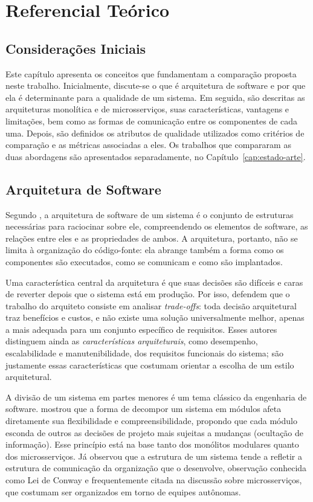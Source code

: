\chapter{Referencial Teórico}
\label{cap:referencial}

\section{Considerações Iniciais}

Este capítulo apresenta os conceitos que fundamentam a comparação proposta neste trabalho.
Inicialmente, discute-se o que é arquitetura de software e por que ela é determinante para a
qualidade de um sistema. Em seguida, são descritas as arquiteturas monolítica e de
microsserviços, suas características, vantagens e limitações, bem como as formas de
comunicação entre os componentes de cada uma. Depois, são definidos os atributos de qualidade
utilizados como critérios de comparação e as métricas associadas a eles. Os trabalhos que
compararam as duas abordagens são apresentados separadamente, no
Capítulo~\ref{cap:estado-arte}.

\section{Arquitetura de Software}

Segundo , a arquitetura de software de um sistema é o conjunto de
estruturas necessárias para raciocinar sobre ele, compreendendo os elementos de software, as
relações entre eles e as propriedades de ambos. A arquitetura, portanto, não se limita à
organização do código-fonte: ela abrange também a forma como os componentes são executados,
como se comunicam e como são implantados.

Uma característica central da arquitetura é que suas decisões são difíceis e caras de reverter
depois que o sistema está em produção. Por isso,  defendem que o
trabalho do arquiteto consiste em analisar \textit{trade-offs}: toda decisão arquitetural traz
benefícios e custos, e não existe uma solução universalmente melhor, apenas a mais adequada
para um conjunto específico de requisitos. Esses autores distinguem ainda as
\textit{características arquiteturais}, como desempenho, escalabilidade e manutenibilidade,
dos requisitos funcionais do sistema; são justamente essas características que costumam
orientar a escolha de um estilo arquitetural.

A divisão de um sistema em partes menores é um tema clássico da engenharia de software.
 mostrou que a forma de decompor um sistema em módulos afeta
diretamente sua flexibilidade e compreensibilidade, propondo que cada módulo esconda de
outros as decisões de projeto mais sujeitas a mudanças (ocultação de informação). Esse
princípio está na base tanto dos monólitos modulares quanto dos microsserviços. Já
 observou que a estrutura de um sistema tende a refletir a estrutura de
comunicação da organização que o desenvolve, observação conhecida como Lei de Conway e
frequentemente citada na discussão sobre microsserviços, que costumam ser organizados em torno
de equipes autônomas.

